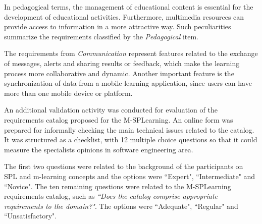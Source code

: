 In pedagogical terms, the management of educational content is essential for the development of educational activities. Furthermore, multimedia resources can provide access to information in a more attractive way. Such peculiarities summarize the requirements classified by the \textit{Pedagogical} item.

The requirements from \textit{Communication} represent features related to the exchange of messages, alerts and sharing results or feedback, which make the learning process more collaborative and dynamic. Another important feature is the synchronization of data from a mobile learning application, since users can have more than one mobile device or platform.

An additional validation activity was conducted for evaluation of the requirements catalog proposed for the M-SPLear\allowbreak ning. An online form was prepared for informally checking the main technical issues related to the catalog. It was structured as a checklist, with 12 multiple choice questions so that it could measure the specialists opinions in software engineering area.

The first two questions were related to the background of the participants on SPL and m-learning concepts and the options were ``Expert", ``Intermediate" and ``Novice". The ten remaining questions were related to the M-SPLear\allowbreak ning requirements catalog, such as \textit{``Does the catalog comprise appropriate requirements to the domain?"}. The options were ``Adequate", ``Regular" and ``Unsatisfactory".

